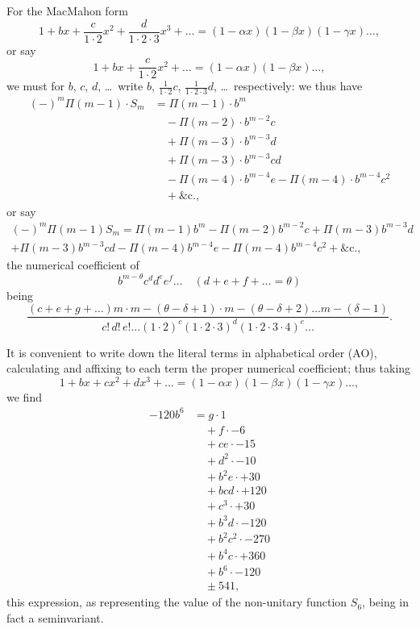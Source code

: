 \documentclass[12pt,a4paper]{article}
\begin{document}
For the MacMahon form
\[
1 + bx + \frac{c}{1 \cdot 2}x^2 + \frac{d}{1 \cdot 2 \cdot 3}x^3 + \ldots = (1 - \alpha x)(1 - \beta x)(1 - \gamma x)\ldots,
\]
or say
\[
1 + bx + \frac{c}{1 \cdot 2}x^2 + \ldots = (1 - \alpha x)(1 - \beta x)\ldots,
\]
we must for $b$, $c$, $d$, \ldots\ write $b$, $\frac{1}{1 \cdot 2}c$, $\frac{1}{1 \cdot 2 \cdot 3}d$, \ldots\ respectively: we thus have
\begin{align*}
(-)^m \Pi(m-1) \cdot S_m &= \Pi(m-1) \cdot b^m\\
&\quad - \Pi(m-2) \cdot b^{m-2}c\\
&\quad + \Pi(m-3) \cdot b^{m-3}d\\
&\quad + \Pi(m-3) \cdot b^{m-3}cd\\
&\quad - \Pi(m-4) \cdot b^{m-4}e - \Pi(m-4) \cdot b^{m-4}c^2\\
&\quad + \&\text{c.},
\end{align*}
or say
\begin{multline*}
(-)^m \Pi(m-1) S_m = \Pi(m-1)b^m - \Pi(m-2)b^{m-2}c + \Pi(m-3)b^{m-3}d\\
+ \Pi(m-3)b^{m-3}cd - \Pi(m-4)b^{m-4}e - \Pi(m-4)b^{m-4}c^2 + \&\text{c.},
\end{multline*}
the numerical coefficient of
\[
b^{m-\theta} c^d d^e e^f \ldots \quad (d + e + f + \ldots = \theta)
\]
being
\[
\frac{(c + e + g + \ldots)m \cdot m - (\theta - \delta + 1) \cdot m - (\theta - \delta + 2) \ldots m - (\delta - 1)}{c!\,d!\,e!\ldots (1 \cdot 2)^c (1 \cdot 2 \cdot 3)^d (1 \cdot 2 \cdot 3 \cdot 4)^e \ldots}.
\]

\newpage
It is convenient to write down the literal terms in alphabetical order (AO),
calculating and affixing to each term the proper numerical coefficient; thus taking
\[
1 + bx + cx^2 + dx^3 + \ldots = (1 - \alpha x)(1 - \beta x)(1 - \gamma x)\ldots,
\]
we find
\begin{align*}
-120b^6 &= g \cdot 1\\
&\quad + f \cdot -6\\
&\quad + ce \cdot -15\\
&\quad + d^2 \cdot -10\\
&\quad + b^2e \cdot +30\\
&\quad + bcd \cdot +120\\
&\quad + c^3 \cdot +30\\
&\quad + b^3d \cdot -120\\
&\quad + b^2c^2 \cdot -270\\
&\quad + b^4c \cdot +360\\
&\quad + b^6 \cdot -120\\
&\quad \pm 541,
\end{align*}
this expression, as representing the value of the non-unitary function $S_6$, being in
fact a seminvariant.
\end{document}
